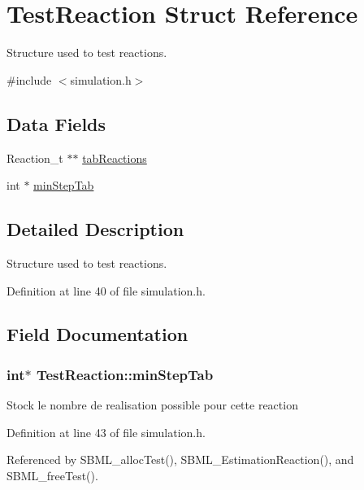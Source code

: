 \hypertarget{structTestReaction}{
\section{TestReaction Struct Reference}
\label{structTestReaction}
}


Structure used to test reactions.  




{\ttfamily \#include $<$simulation.h$>$}

\subsection*{Data Fields}
\begin{DoxyCompactItemize}
\item 
Reaction\_\-t $\ast$$\ast$ \hyperlink{structTestReaction_abc440bf3f3edc3d4ca6ad896962ffad2}{tabReactions}
\item 
int $\ast$ \hyperlink{structTestReaction_a04037c90652dceaab2f416e099be460c}{minStepTab}
\end{DoxyCompactItemize}


\subsection{Detailed Description}
Structure used to test reactions. 

Definition at line 40 of file simulation.h.



\subsection{Field Documentation}
\hypertarget{structTestReaction_a04037c90652dceaab2f416e099be460c}{
\subsubsection[{minStepTab}]{\setlength{\rightskip}{0pt plus 5cm}int$\ast$ {\bf TestReaction::minStepTab}}}
\label{structTestReaction_a04037c90652dceaab2f416e099be460c}
Stock le nombre de realisation possible pour cette reaction 

Definition at line 43 of file simulation.h.



Referenced by SBML\_\-allocTest(), SBML\_\-EstimationReaction(), and SBML\_\-freeTest().


